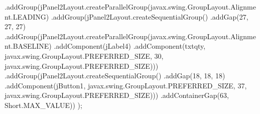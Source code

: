 \documentclass[
  10pt,
]{article}
\newenvironment{Shaded}{}{}
\newcommand{\BuiltInTok}[1]{\textcolor[rgb]{0.00,0.50,0.00}{#1}}
\newcommand{\DecValTok}[1]{\textcolor[rgb]{0.25,0.63,0.44}{#1}}
\newcommand{\FunctionTok}[1]{\textcolor[rgb]{0.02,0.16,0.49}{#1}}
\newcommand{\NormalTok}[1]{#1}
\newcommand{\OperatorTok}[1]{\textcolor[rgb]{0.40,0.40,0.40}{#1}}
\begin{document}
\begin{Shaded}
\begin{Highlighting}[numbers=left,,]
                \OperatorTok{.}\FunctionTok{addGroup}\OperatorTok{(}\NormalTok{jPanel2Layout}\OperatorTok{.}\FunctionTok{createParallelGroup}\OperatorTok{(}\NormalTok{javax}\OperatorTok{.}\FunctionTok{swing}\OperatorTok{.}\FunctionTok{GroupLayout}\OperatorTok{.}\FunctionTok{Alignment}\OperatorTok{.}\FunctionTok{LEADING}\OperatorTok{)}
                    \OperatorTok{.}\FunctionTok{addGroup}\OperatorTok{(}\NormalTok{jPanel2Layout}\OperatorTok{.}\FunctionTok{createSequentialGroup}\OperatorTok{()}
                        \OperatorTok{.}\FunctionTok{addGap}\OperatorTok{(}\DecValTok{27}\OperatorTok{,} \DecValTok{27}\OperatorTok{,} \DecValTok{27}\OperatorTok{)}
                        \OperatorTok{.}\FunctionTok{addGroup}\OperatorTok{(}\NormalTok{jPanel2Layout}\OperatorTok{.}\FunctionTok{createParallelGroup}\OperatorTok{(}\NormalTok{javax}\OperatorTok{.}\FunctionTok{swing}\OperatorTok{.}\FunctionTok{GroupLayout}\OperatorTok{.}\FunctionTok{Alignment}\OperatorTok{.}\FunctionTok{BASELINE}\OperatorTok{)}
                            \OperatorTok{.}\FunctionTok{addComponent}\OperatorTok{(}\NormalTok{jLabel4}\OperatorTok{)}
                            \OperatorTok{.}\FunctionTok{addComponent}\OperatorTok{(}\NormalTok{txtqty}\OperatorTok{,}\NormalTok{ javax}\OperatorTok{.}\FunctionTok{swing}\OperatorTok{.}\FunctionTok{GroupLayout}\OperatorTok{.}\FunctionTok{PREFERRED\_SIZE}\OperatorTok{,} \DecValTok{30}\OperatorTok{,}\NormalTok{ javax}\OperatorTok{.}\FunctionTok{swing}\OperatorTok{.}\FunctionTok{GroupLayout}\OperatorTok{.}\FunctionTok{PREFERRED\_SIZE}\OperatorTok{)))}
                    \OperatorTok{.}\FunctionTok{addGroup}\OperatorTok{(}\NormalTok{jPanel2Layout}\OperatorTok{.}\FunctionTok{createSequentialGroup}\OperatorTok{()}
                        \OperatorTok{.}\FunctionTok{addGap}\OperatorTok{(}\DecValTok{18}\OperatorTok{,} \DecValTok{18}\OperatorTok{,} \DecValTok{18}\OperatorTok{)}
                        \OperatorTok{.}\FunctionTok{addComponent}\OperatorTok{(}\NormalTok{jButton1}\OperatorTok{,}\NormalTok{ javax}\OperatorTok{.}\FunctionTok{swing}\OperatorTok{.}\FunctionTok{GroupLayout}\OperatorTok{.}\FunctionTok{PREFERRED\_SIZE}\OperatorTok{,} \DecValTok{37}\OperatorTok{,}\NormalTok{ javax}\OperatorTok{.}\FunctionTok{swing}\OperatorTok{.}\FunctionTok{GroupLayout}\OperatorTok{.}\FunctionTok{PREFERRED\_SIZE}\OperatorTok{)))}
                \OperatorTok{.}\FunctionTok{addContainerGap}\OperatorTok{(}\DecValTok{63}\OperatorTok{,} \BuiltInTok{Short}\OperatorTok{.}\FunctionTok{MAX\_VALUE}\OperatorTok{))}
        \OperatorTok{);}


\end{Highlighting}
\end{Shaded}
\end{document}
